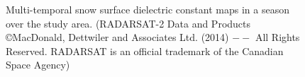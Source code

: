 \begin{figure}[!htbp]
	\centering
	 \hspace{1mm}
	\hspace{1mm}
	\caption[Multi-temporal snow surface dielectric constant maps]{Multi-temporal snow surface dielectric constant maps in a season over the study area. (RADARSAT-2 Data and Products ©MacDonald, Dettwiler and Associates Ltd. (2014) $--$ All Rights Reserved. RADARSAT is an official trademark of the Canadian Space Agency) }
	\label{fig:Multi_temporal_SSD}
\end{figure}

